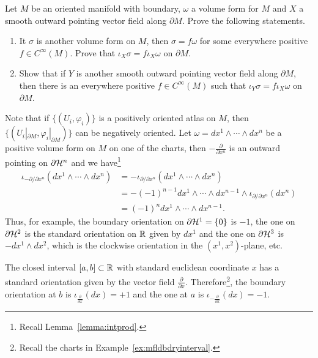 \begin{exercise}\label{ex:vfshape}
  Let $M$ be an oriented manifold with boundary, $\omega$ a volume form for $M$ and $X$ a smooth outward pointing vector field along $\partial M$.
  Prove the following statements.
  \begin{enumerate}
    \item It $\sigma$ is another volume form on $M$, then $\sigma = f\omega$ for some everywhere positive $f\in C^\infty(M)$. Prove that  $\iota_X\sigma = f\iota_X \omega$ on $\partial M$.
    \item Show that if $Y$ is another smooth outward pointing vector field along $\partial M$, then there is an everywhere positive $f\in C^\infty(M)$ such that $\iota_Y\sigma = f \iota_X \omega$ on $\partial M$.
  \end{enumerate}
\end{exercise}

Note that if $\{(U_i, \varphi_i)\}$ is a positively oriented atlas on $M$, then $\{(U_i|_{\partial M}, \varphi_i|_{\partial M})\}$ can be negatively oriented. 
Let $\omega = dx^1\wedge\cdots\wedge dx^n$ be a positive volume form on $M$ on one of the charts, then $-\frac{\partial}{\partial x^n}$ is an outward pointing on $\partial \mathcal{H}^n$ and we have\footnote{Recall Lemma~\ref{lemma:intprod}.}
\begin{align}
  \iota_{-{\partial}/\!{\partial x^n}} (dx^1\wedge\cdots\wedge dx^n)
  &= -\iota_{{\partial}/\!{\partial x^n}} (dx^1\wedge\cdots\wedge dx^n) \\
  &= -(-1)^{n-1} dx^1\wedge\cdots\wedge dx^{n-1}\wedge \iota_{{\partial}/\!{\partial x^n}} (dx^n) \\
  &= (-1)^n dx^1\wedge\cdots\wedge dx^{n-1}.
\end{align}
Thus, for example, the boundary orientation on $\partial \mathcal{H}^1 = \{0\}$ is $-1$, the one on $\partial \mathcal{H}^2$ is the standard orientation on $\mathbb{R}$ given by $dx^1$ and the one on $\partial \mathcal{H}^3$ is $-dx^1\wedge dx^2$, which is the clockwise orientation in the $(x^1, x^2)$-plane, etc.

\begin{example}\label{ex:int:bdryo}
  The closed interval $[a,b]\subset\mathbb{R}$ with standard euclidean coordinate $x$ has a standard orientation given by the vector field $\frac{\partial}{\partial x}$. 
  Therefore\footnote{Recall the charts in Example~\ref{ex:mfldbdryinterval}.}, the boundary orientation at $b$ is $\iota_{\frac{\partial}{\partial x}}(dx) = +1$ and the one at $a$ is $\iota_{-\frac{\partial}{\partial x}}(dx) = -1$.
\end{example}

